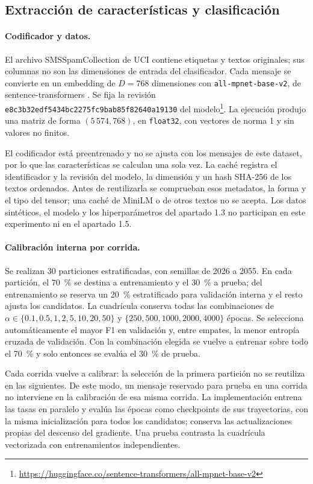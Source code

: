 \subsection{Extracción de características y clasificación}
\label{sec:caracteristicas}

\paragraph{Codificador y datos.} El archivo SMSSpamCollection de UCI
contiene etiquetas y textos originales; sus columnas no son las dimensiones
de entrada del clasificador. Cada mensaje se convierte en un embedding de
$D=768$ dimensiones con \texttt{all-mpnet-base-v2}, de
sentence-transformers \cite{reimers2019sentence}. Se fija la revisión
\texttt{e8c3b32edf5434bc2275fc9bab85f82640a19130} del
modelo\footnote{\url{https://huggingface.co/sentence-transformers/all-mpnet-base-v2}}.
La ejecución produjo una matriz de forma $(5\,574,768)$, en
\texttt{float32}, con vectores de norma 1 y sin valores no finitos.

El codificador está preentrenado y no se ajusta con los mensajes de este
dataset, por lo que las características se calculan una sola vez. La caché
registra el identificador y la revisión del modelo, la dimensión y un hash
SHA-256 de los textos ordenados. Antes de reutilizarla se comprueban esos
metadatos, la forma y el tipo del tensor; una caché de MiniLM o de otros
textos no se acepta. Los datos sintéticos, el modelo y los hiperparámetros
del apartado 1.3 no participan en este experimento ni en el apartado 1.5.

\paragraph{Calibración interna por corrida.}
\label{sec:calibracion}
Se realizan 30 particiones estratificadas, con semillas de 2026 a 2055. En
cada partición, el 70~\% se destina a entrenamiento y el 30~\% a prueba;
del entrenamiento se reserva un 20~\% estratificado para validación interna
y el resto ajusta los candidatos. La cuadrícula conserva todas las
combinaciones de $\alpha\in\{0.1,0.5,1,2,5,10,20,50\}$ y
$\{250,500,1000,2000,4000\}$ épocas. Se selecciona automáticamente el mayor
F1 en validación y, entre empates, la menor entropía cruzada de validación.
Con la combinación elegida se vuelve a entrenar sobre todo el 70~\% y
solo entonces se evalúa el 30~\% de prueba.

Cada corrida vuelve a calibrar: la selección de la primera partición no se
reutiliza en las siguientes. De este modo, un mensaje reservado para prueba
en una corrida no interviene en la calibración de esa misma corrida. La
implementación entrena las tasas en paralelo y evalúa las épocas como
checkpoints de sus trayectorias, con la misma inicialización para todos los
candidatos; conserva las actualizaciones propias del descenso del gradiente.
Una prueba contrasta la cuadrícula vectorizada con entrenamientos
independientes.

